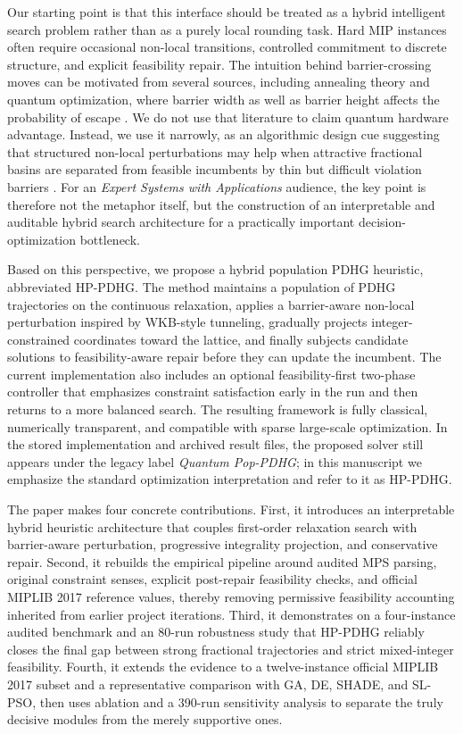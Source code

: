 Our starting point is that this interface should be treated as a hybrid intelligent search problem rather than as a purely local rounding task. Hard MIP instances often require occasional non-local transitions, controlled commitment to discrete structure, and explicit feasibility repair. The intuition behind barrier-crossing moves can be motivated from several sources, including annealing theory and quantum optimization, where barrier width as well as barrier height affects the probability of escape \cite{kirkpatrick1983optimization,kadowaki1998quantum,das2008colloquium}. We do not use that literature to claim quantum hardware advantage. Instead, we use it narrowly, as an algorithmic design cue suggesting that structured non-local perturbations may help when attractive fractional basins are separated from feasible incumbents by thin but difficult violation barriers \cite{johnson2011quantum,ronnow2014defining,denchev2016computational}. For an \emph{Expert Systems with Applications} audience, the key point is therefore not the metaphor itself, but the construction of an interpretable and auditable hybrid search architecture for a practically important decision-optimization bottleneck.

Based on this perspective, we propose a hybrid population PDHG heuristic, abbreviated HP-PDHG. The method maintains a population of PDHG trajectories on the continuous relaxation, applies a barrier-aware non-local perturbation inspired by WKB-style tunneling, gradually projects integer-constrained coordinates toward the lattice, and finally subjects candidate solutions to feasibility-aware repair before they can update the incumbent. The current implementation also includes an optional feasibility-first two-phase controller that emphasizes constraint satisfaction early in the run and then returns to a more balanced search. The resulting framework is fully classical, numerically transparent, and compatible with sparse large-scale optimization. In the stored implementation and archived result files, the proposed solver still appears under the legacy label \emph{Quantum Pop-PDHG}; in this manuscript we emphasize the standard optimization interpretation and refer to it as HP-PDHG.

The paper makes four concrete contributions. First, it introduces an interpretable hybrid heuristic architecture that couples first-order relaxation search with barrier-aware perturbation, progressive integrality projection, and conservative repair. Second, it rebuilds the empirical pipeline around audited MPS parsing, original constraint senses, explicit post-repair feasibility checks, and official MIPLIB 2017 reference values, thereby removing permissive feasibility accounting inherited from earlier project iterations. Third, it demonstrates on a four-instance audited benchmark and an 80-run robustness study that HP-PDHG reliably closes the final gap between strong fractional trajectories and strict mixed-integer feasibility. Fourth, it extends the evidence to a twelve-instance official MIPLIB 2017 subset and a representative comparison with GA, DE, SHADE, and SL-PSO, then uses ablation and a 390-run sensitivity analysis to separate the truly decisive modules from the merely supportive ones.

